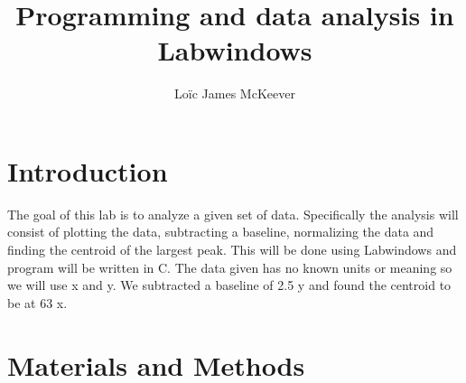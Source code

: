 \documentclass{article}
\begin{document}
\title{Programming and data analysis in Labwindows}
\author{Loïc James McKeever}

\maketitle

\section{Introduction}


 The goal of this lab is to analyze a given set of data.  Specifically the analysis will consist of plotting the data, subtracting a baseline, normalizing the data and finding the centroid of the largest peak.  This will be done using Labwindows and program will be written in C.  The data given has no known units or meaning so we will use x and y.  We subtracted a baseline of 2.5 y and found the centroid to be at 63 x.

\section{Materials and Methods}
\end{document}
